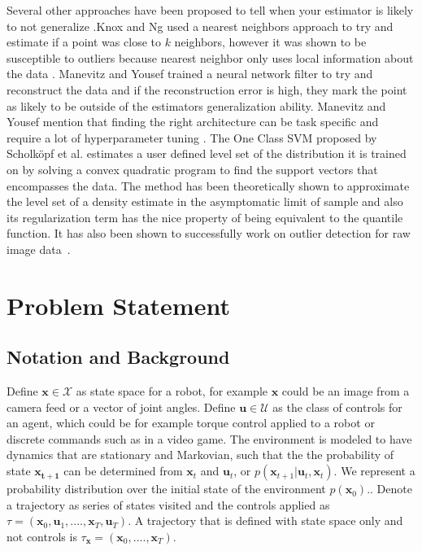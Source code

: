 \documentclass[10pt, conference]{ieeeconf}      %
\newcommand{\bu}{\mathbf{u}}
\newcommand{\bx}{\mathbf{x}}
\begin{document}
 Several other approaches have been proposed to tell when your estimator is likely to not generalize \cite{2003novelty}.Knox and Ng used a nearest neighbors approach to try and estimate if a point was close to $k$ neighbors, however it was shown to be susceptible to outliers because nearest neighbor only uses local information about the data \cite{knox1998algorithms}. Manevitz and Yousef trained a neural network filter to try and reconstruct the data and if the reconstruction error is high, they mark the point as likely to be outside of the estimators generalization ability. Manevitz and Yousef mention  that finding the right architecture can be task specific and require a lot of hyperparameter tuning  \cite{manevitz2002one}. The One Class SVM proposed by Scholk{\"o}pf et al. estimates a user defined level set of the distribution it is trained on by solving a convex quadratic program   to find the support vectors that encompasses the data. The method has been theoretically shown to approximate the level set of a density estimate in the asymptomatic  limit of sample and also its regularization term has the nice property of being equivalent to the quantile function\cite{vert2006consistency}. It has also been shown to successfully work on outlier detection for raw image data~\cite{liu2014unsupervised}.


\section{Problem Statement}

\subsection{Notation and Background}
Define $\mathbf{x} \in \mathcal{X}$ as state space for a robot, for example $\mathbf{x}$ could be an image from a camera feed or a vector of joint angles. Define $\mathbf{u} \in \mathcal{U}$ as the class of controls for an agent, which could be for example torque control applied to a robot or discrete commands such as in a video game. The environment is modeled to have dynamics that are stationary and Markovian, such that the the probability of state $\mathbf{x_{t+1}}$ can be determined from $\mathbf{x}_t$ and $\mathbf{u}_t$, or $p(\bx_{t+1}|\bu_t,\bx_t)$.  We represent a probability distribution over the initial state of the environment $p(\bx_0)$.. Denote a trajectory as series of states visited and the controls applied  as $\tau = (\mathbf{x}_0,\mathbf{u}_1, ...., \mathbf{x}_T,\mathbf{u}_T)$.  A trajectory that is defined with state space only and not controls is $\tau_{\bx} = (\bx_0,....,\bx_T)$.
\end{document}
